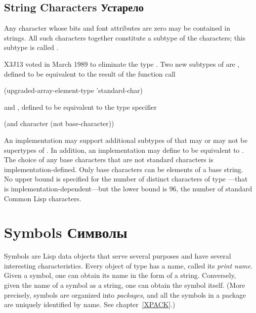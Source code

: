 \begin{obsolete}
\subsection{String Characters Устарело}

Any character whose bits and font attributes are zero may be contained
in strings.  All such characters together constitute a subtype of
the characters; this subtype is called .
\end{obsolete}


\begin{newer}
X3J13 voted in March 1989 
to eliminate the type .
Two new subtypes of  are ,
defined to be equivalent to the result of the function call
\begin{lisp}
(upgraded-array-element-type 'standard-char)
\end{lisp}
and , defined to be equivalent to the type specifier
\begin{lisp}
(and character (not base-character))
\end{lisp}
An implementation may support additional subtypes of 
that may or may not be supertypes of .
In addition, an implementation may define 
to be equivalent to .  The choice of any base characters
that are not standard characters is implementation-defined.
Only base characters can be elements of a base string.
No upper bound is specified for the number of distinct characters
of type ---that is implementation-dependent---but the lower
bound is 96, the number of standard Common Lisp characters.
\end{newer}

\section{Symbols Символы}

Symbols are Lisp data objects that serve several purposes
and have several interesting characteristics.  Every object of
type  has a name,
called its {\it print name}.  Given a symbol, one can
obtain its name in the form of a string.  Conversely,
given the name of a symbol as a string, one can obtain the
symbol itself.  (More precisely, symbols are organized into
{\it packages}, and all the symbols in a package are uniquely
identified by name.  See chapter~\ref{XPACK}.)

